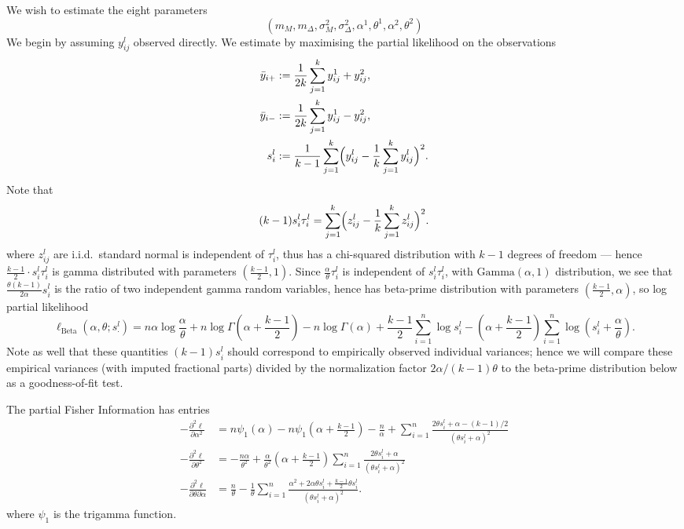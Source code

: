 \documentclass[
]{article}
\begin{document}
We wish to estimate the eight parameters
\[
(m_M,m_\Delta,\sigma^2_M,\sigma^2_\Delta,\alpha^1,\theta^1,\alpha^2,\theta^2)
\]
We begin by assuming \(y_{ij}^l\) observed directly. We estimate
by maximising the partial likelihood on the observations
\begin{align*}
  \bar{y}_{i+}&:= \frac{1}{2k} \sum_{j=1}^k y_{ij}^1 + y_{ij}^2,\\
  \bar{y}_{i-}&:= \frac{1}{2k} \sum_{j=1}^k y_{ij}^1 - y_{ij}^2,\\
  s_i^l&:=  \frac{1}{k-1}\sum_{j=1}^k \Bigl( y_{ij}^l - \frac{1}{k} \sum_{j=1}^k y_{ij}^l \Bigr)^2.
\end{align*}
Note that
\[
(k-1)s_i^l \tau_i^l =\sum_{j=1}^k \Bigl( z_{ij}^l - \frac{1}{k} \sum_{j=1}^k z_{ij}^l \Bigr)^2.
\]
where \(z_{ij}^l\) are i.i.d.~standard normal
is independent of \(\tau_i^l\), thus has a chi-squared distribution
with \(k-1\) degrees of freedom --- hence \(\frac{k-1}{2}\cdot s_i^l\tau_i^l\) is
gamma distributed with parameters \((\frac{k-1}{2},1)\). Since \(\frac{\alpha}{\theta}\tau_i^l\) is independent of \(s_i^l\tau_i^l\), with \(\mathrm{Gamma}(\alpha,1)\) distribution, we see that \(\frac{\theta(k-1)}{2\alpha}s_i^l\) is the ratio of two independent gamma random variables, hence has beta-prime distribution with parameters \(\left(\frac{k-1}{2}, \alpha \right)\), so log partial likelihood
\[
  \ell_{\operatorname{Beta}}(\alpha,\theta;s^l_\cdot)=n\alpha \log\frac{\alpha}{\theta}+n\log\Gamma\left(\alpha+\frac{k-1}{2}\right)-n\log\Gamma(\alpha)
  + \frac{k-1}{2} \sum_{i=1}^n \log s_i^l -\left(\alpha+\frac{k-1}{2}\right) \sum_{i=1}^n \log \left(s_i^l+\frac\alpha\theta\right).
\]
Note as well that these quantities \((k-1)s_i^l\) should correspond to empirically observed individual variances; hence we will compare these empirical variances (with imputed fractional parts) divided by the normalization factor \(2\alpha/(k-1)\theta\) to the beta-prime distribution below as a goodness-of-fit test.

The partial Fisher Information has entries
\begin{align*}
 -\frac{\partial^2 \ell}{\partial \alpha^2} &=
   n\psi_1\left(\alpha\right) - n\psi_1\left(\alpha+\frac{k-1}{2}\right)
  - \frac{n}{\alpha} +\sum_{i=1}^n \frac{2\theta s_i^l + \alpha-(k-1)/2}{(\theta s_i^l + \alpha)^2}\\
-\frac{\partial^2 \ell}{\partial \theta^2} &=
   -\frac{n \alpha}{\theta^2} +\frac{\alpha}{\theta^2}\left(\alpha+\frac{k-1}{2}\right)\sum_{i=1}^n \frac{2\theta s_i^l + \alpha}{(\theta s_i^l + \alpha)^2}\\
-\frac{\partial^2 \ell}{\partial \theta\partial\alpha} &= \frac{n}{\theta}-
   \frac1\theta \sum_{i=1}^n \frac{\alpha^2+2\alpha\theta s_i^l+\frac{k-1}{2}\theta s_i^l}{(\theta s_i^l + \alpha)^2}.
\end{align*}
where \(\psi_1\) is the trigamma function.
\end{document}
